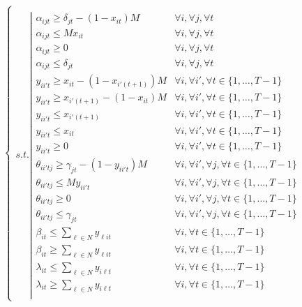 \documentclass[a4paper]{book}
\begin{document}
\begin{center}
   \begin{eqnarray*}
     \ \left \{ \begin{array}{ll}
     \\
    s.t. \left |
    \begin{array}{llll}
   \alpha_{ijt} \geq \delta_{jt}-(1-x_{it})M& \forall i, \forall j, \forall t\\
   \alpha_{ijt} \leq M x_{it} & \forall i, \forall j, \forall t\\
   \alpha_{ijt} \geq 0 & \forall i, \forall j, \forall t\\
   \alpha_{ijt} \leq \delta_{jt} & \forall i, \forall j, \forall t\\
   y_{ii't} \geq x_{it} - (1-x_{i'(t+1)})M & \forall i, \forall i', \forall t \in \{1,\ldots,T-1\}\\
   y_{ii't} \geq x_{i'(t+1)} - (1-x_{it})M & \forall i, \forall i', \forall t \in \{1,\ldots,T-1\}\\
   y_{ii't} \leq x_{i'(t+1)} & \forall i, \forall i', \forall t \in \{1,\ldots,T-1\}\\
   y_{ii't} \leq x_{it} & \forall i, \forall i', \forall t \in \{1,\ldots,T-1\} \\
   y_{ii't} \geq 0 & \forall i, \forall i', \forall t \in \{1,\ldots,T-1\} \\
   \theta_{ii'tj} \geq \gamma_{jt} - (1-y_{ii't})M & \forall i, \forall i', \forall j, \forall t \in \{1,\ldots,T-1\} \\
   \theta_{ii'tj} \leq M y_{ii't} & \forall i, \forall i', \forall j, \forall t \in \{1,\ldots,T-1\} \\
   \theta_{ii'tj} \geq 0 & \forall i, \forall i', \forall j, \forall t \in \{1,\ldots,T-1\} \\
   \theta_{ii'tj} \leq \gamma_{jt} & \forall i, \forall i', \forall j, \forall t \in \{1,\ldots,T-1\} \\
   \beta_{it}\leq \sum\limits_{\ell \in N} y_{\ell i t} & \forall i, \forall t \in \{1,\ldots,T-1\}\\
   \beta_{it}\geq \sum\limits_{\ell \in N} y_{\ell i t}& \forall i, \forall t \in \{1,\ldots,T-1\}\\
   
   
   \lambda_{it}\leq \sum\limits_{\ell \in N} y_{i \ell t} & \forall i, \forall t \in \{1,\ldots,T-1\}\\
   \lambda_{it}\geq \sum\limits_{\ell \in N} y_{i \ell t}& \forall i, \forall t \in \{1,\ldots,T-1\}\\
   

      \end{array}
    \right.
    \end{array} 
    \right.
    \end{eqnarray*}
    \end{center}  
\end{document}
